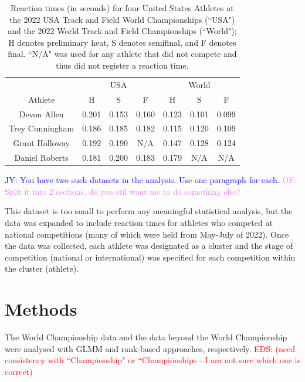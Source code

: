 \documentclass[12pt, letterpaper, titlepage]{article}
\newcommand{\jy}[1]{\textcolor{blue}{JY: #1}}
\newcommand{\eds}[1]{\textcolor{red}{EDS: (#1)}}
\newcommand{\of}[1]{\textcolor{violet}{OF: #1}}
\begin{document}
\begin{table}
\begin{center}
  \caption{Reaction times (in seconds) for four United States Athletes at the 
	2022 USA Track
  and Field World Championships (``USA") and the 2022 World Track and Field 
	Championships (``World"); H denotes preliminary heat, S denotes semifinal, and 
	F denotes final.
  ``N/A" was used for any athlete that did not compete and thus did not register 
  a reaction time. }
  \begin{tabular}{c c c c c c c} 
   \toprule
	 & \multicolumn{3}{c}{USA} & \multicolumn{3}{c}{World} \\
	\cmidrule(lr){2-4}
    \cmidrule(lr){5-7}
   Athlete &  H &  S &  F &  H &  S &  F \\ [0.5ex] 
   \midrule
   Devon Allen & 0.201 & 0.153 & 0.160 & 0.123 & 0.101 & 0.099 \\ 
   Trey Cunningham & 0.186 & 0.185 & 0.182 & 0.115 & 0.120 & 0.109 \\
   Grant Holloway & 0.192 & 0.190 & N/A & 0.147 & 0.128 & 0.124 \\
   Daniel Roberts & 0.181 & 0.200 & 0.183 & 0.179 & N/A & N/A \\ [0.5ex]
   \bottomrule
  \end{tabular}
  \label{fig:USAvsWorld}
  
  \end{center}
\end{table}

\jy{You have two such datasets in the analysis. Use one paragraph for each.}
\of{Split it into 2 sections, do you stil want me to do something else?}


This dataset is too small to perform any meaningful statistical analysis, but
the data was expanded to include reaction times for athletes who competed at 
national competitions (many of which were held from May-July of 2022). Once the 
data was collected, each athlete was designated as a cluster and the stage of
competition (national or international) was specified for each competition 
within the cluster (athlete).  


\section{Methods} \label{sec:Methods}

The World Championship data and the data beyond the World Championship were
analysed with GLMM and rank-based approaches, respectively.
\eds{need consistency with ``Championship" or ``Championships - I am not sure 
which one is correct}
\end{document}
